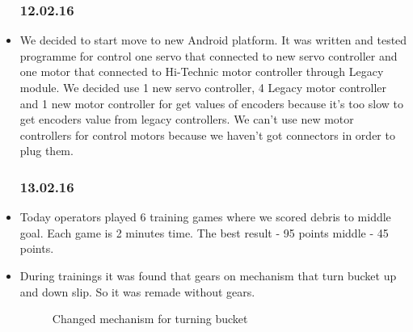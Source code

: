 \begin{itemize}
	\subsubsection{12.02.16}
		\item We decided to start move to new Android platform. It was written and tested programme for control one servo that connected to new servo controller and one motor that connected to Hi-Technic motor controller through Legacy module. We decided use 1 new servo controller, 4 Legacy motor controller and 1 new motor controller for get values of encoders because it's too slow to get encoders value from legacy controllers. We can't use new motor controllers for control motors because we haven't got connectors in order to plug them.	
	\subsubsection{13.02.16}
		\item Today operators played 6 training games where we scored debris to middle goal. Each game is 2 minutes time. The best result - 95 points middle - 45 points.	
		
		\item During trainings it was found that gears on mechanism that turn bucket up and down slip. So it was remade without gears.
		\begin{figure}[H]
			\begin{minipage}[h]{\linewidth}
				\caption{Changed mechanism for turning bucket}
			\end{minipage}
		\end{figure} 	
		

\end{itemize}
